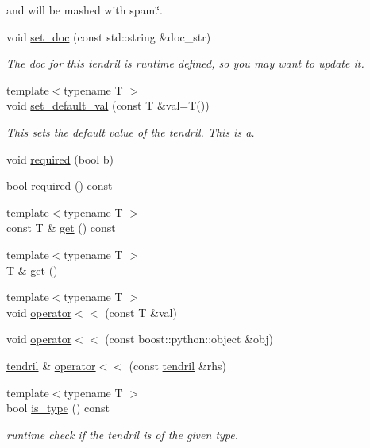 \begin{DoxyCompactItemize}
\begin{DoxyCompactList}
and will be mashed with spam.\char`\"{}. \end{DoxyCompactList}\item 
void \hyperlink{classecto_1_1tendril_ad56ae7364e7f7464eba444aebc50adc8}{set\-\_\-doc} (const std\-::string \&doc\-\_\-str)
\begin{DoxyCompactList}\small\item\em The doc for this tendril is runtime defined, so you may want to update it. \end{DoxyCompactList}\item 
{\footnotesize template$<$typename T $>$ }\\void \hyperlink{classecto_1_1tendril_a9186713043e34915df9488fb135110b3}{set\-\_\-default\-\_\-val} (const T \&val=T())
\begin{DoxyCompactList}\small\item\em This sets the default value of the tendril. This is a. \end{DoxyCompactList}\item 
void \hyperlink{classecto_1_1tendril_a216eb6b817644e1dfd76d3ba07d0ced7}{required} (bool b)
\item 
bool \hyperlink{classecto_1_1tendril_aa10be79605183977989cf01956aedeb6}{required} () const 
\item 
{\footnotesize template$<$typename T $>$ }\\const T \& \hyperlink{classecto_1_1tendril_aeeacd721a1d85f6c71c6d238b47c17f6}{get} () const 
\item 
{\footnotesize template$<$typename T $>$ }\\T \& \hyperlink{classecto_1_1tendril_a25420b71b89431659b310730ca6c55f0}{get} ()
\item 
{\footnotesize template$<$typename T $>$ }\\void \hyperlink{classecto_1_1tendril_ab02075b0d910360104974c1771edcc7f}{operator$<$$<$} (const T \&val)
\item 
void \hyperlink{classecto_1_1tendril_af9df4c4225712b440c9340d8969e337e}{operator$<$$<$} (const boost\-::python\-::object \&obj)
\item 
\hyperlink{classecto_1_1tendril}{tendril} \& \hyperlink{classecto_1_1tendril_adbf8a7e6ac9bc41d9a17f2f362e8d3f6}{operator$<$$<$} (const \hyperlink{classecto_1_1tendril}{tendril} \&rhs)
\item 
{\footnotesize template$<$typename T $>$ }\\bool \hyperlink{classecto_1_1tendril_adec0a36989492e2bd9ae9f03f954b9af}{is\-\_\-type} () const 
\begin{DoxyCompactList}\small\item\em runtime check if the tendril is of the given type. \end{DoxyCompactList}\item 

\end{DoxyCompactItemize}
